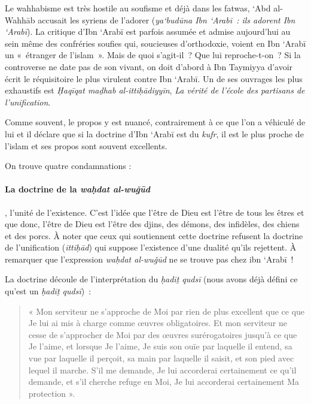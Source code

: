 Le wahhabisme est très hostile au soufisme et déjà dans les fatwas, `Abd
al-Wahhāb accusait les syriens de l'adorer (\emph{ya`budūna Ibn `Arabī~:
ils adorent Ibn `Arabī}). La critique d'Ibn `Arabī est parfois assumée et
admise aujourd'hui au sein même des confréries soufies qui, soucieuses
d'orthodoxie, voient en Ibn `Arabī un «~étranger de l'islam~». Mais de
quoi s'agit-il~? Que lui reproche-t-on~? Si la controverse ne date pas
de son vivant, on doit d'abord à Ibn Taymiyya d'avoir écrit le
réquisitoire le plus virulent contre Ibn `Arabī. Un de ses ouvrages les
plus exhaustifs est \emph{Ḥaqīqat maḏhab al-ittiḥādiyyīn}, \emph{La
vérité de l'école des partisans de l'unification}.

Comme souvent, le propos y est nuancé, contrairement à ce que l'on a
véhiculé de lui et il déclare que si la doctrine d'Ibn `Arabī est du
\emph{kufr}, il est le plus proche de l'islam et ses propos sont souvent
excellents.

On trouve quatre condamnations :


  \paragraph{La doctrine de la \emph{waḥdat al-wuǧūd}}, l'unité de
  l'existence. C'est l'idée que l'être de Dieu est l'être de tous les
  êtres et que donc, l'être de Dieu est l'être des djins, des démons,
  des infidèles, des chiens et des porcs. À noter que ceux qui
  soutiennent cette doctrine refusent la doctrine de l'unification
  (\emph{ittiḥād}) qui suppose l'existence d'une dualité qu'ils
  rejettent. À remarquer que l'expression \emph{waḥdat al-wuǧūd} ne se
  trouve pas chez ibn `Arabī~!

La doctrine découle de l'interprétation du \emph{ḥadīṯ qudsī} (nous
avons déjà défini ce qu'est un \emph{ḥadīṯ qudsī})~:
\begin{quote}


« Mon serviteur ne s'approche de Moi par rien de plus excellent que ce
que Je lui ai mis à charge comme œuvres obligatoires. Et mon serviteur
ne cesse de s'approcher de Moi par des œuvres surérogatoires jusqu'à ce
que Je l'aime, et lorsque Je l'aime, Je suis son ouïe par laquelle il
entend, sa vue par laquelle il perçoit, sa main par laquelle il saisit,
et son pied avec lequel il marche. S'il me demande, Je lui accorderai
certainement ce qu'il demande, et s'il cherche refuge en Moi, Je lui
accorderai certainement Ma protection ».
\end{quote}

